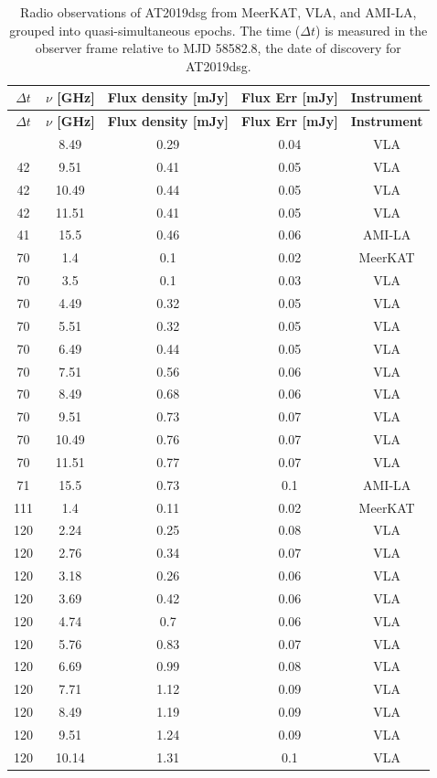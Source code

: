 \documentclass{nature_plusfigure}
\begin{document}
\begin{methods}
\begin{longtable}{|c|c|c|c|c|}
\caption{Radio observations of AT2019dsg from MeerKAT, VLA, and AMI-LA, grouped into quasi-simultaneous epochs. The time ($\Delta t$) is measured in the observer frame relative to MJD 58582.8, the date of discovery for AT2019dsg. \label{tab:radio_data}}\\
\hline
\textbf{$\Delta t$}&\textbf{$\nu$ [GHz]}&\textbf{Flux density [mJy]}&\textbf{Flux Err [mJy]}&\textbf{Instrument}\\%
\hline%
\endfirsthead
\hline%
\textbf{$\Delta t$}&\textbf{$\nu$ [GHz]}&\textbf{Flux density [mJy]}&\textbf{Flux Err [mJy]}&\textbf{Instrument}\\%
\hline%
\endhead
\hline
\endfoot
\hline
\endlastfoot
42&8.49&0.29&0.04&VLA\\%
42&9.51&0.41&0.05&VLA\\%
42&10.49&0.44&0.05&VLA\\%
42&11.51&0.41&0.05&VLA\\%
41&15.5&0.46&0.06&AMI{-}LA\\%
\hline
70&1.4&0.1&0.02&MeerKAT\\%
70&3.5&0.1&0.03&VLA\\%
70&4.49&0.32&0.05&VLA\\%
70&5.51&0.32&0.05&VLA\\%
70&6.49&0.44&0.05&VLA\\%
70&7.51&0.56&0.06&VLA\\%
70&8.49&0.68&0.06&VLA\\%
70&9.51&0.73&0.07&VLA\\%
70&10.49&0.76&0.07&VLA\\%
70&11.51&0.77&0.07&VLA\\%
71&15.5&0.73&0.1&AMI{-}LA\\%
\hline
111&1.4&0.11&0.02&MeerKAT\\%
120&2.24&0.25&0.08&VLA\\%
120&2.76&0.34&0.07&VLA\\%
120&3.18&0.26&0.06&VLA\\%
120&3.69&0.42&0.06&VLA\\%
120&4.74&0.7&0.06&VLA\\%
120&5.76&0.83&0.07&VLA\\%
120&6.69&0.99&0.08&VLA\\%
120&7.71&1.12&0.09&VLA\\%
120&8.49&1.19&0.09&VLA\\%
120&9.51&1.24&0.09&VLA\\%
120&10.14&1.31&0.1&VLA\\%

\end{longtable}
\end{methods}
\end{document}
